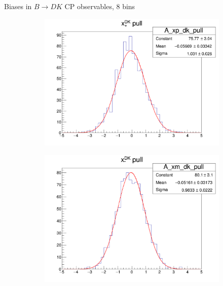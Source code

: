 \documentclass{beamer}
\begin{document}
\begin{frame}{Biases in $B\to DK$ CP observables, $8$ bins}
  \begin{figure}
    \centering
    \vspace{-0.2cm}
    \begin{subfigure}{0.42\textwidth}
      \includegraphics[width = 1.0\textwidth]{A_xp_dk_8Bins_pull.png}
    \end{subfigure}%
    \begin{subfigure}{0.42\textwidth}
      \includegraphics[width = 1.0\textwidth]{A_xm_dk_8Bins_pull.png}
    \end{subfigure}
    \begin{subfigure}{0.42\textwidth}

\end{subfigure}
\end{figure}
\end{frame}
\end{document}
